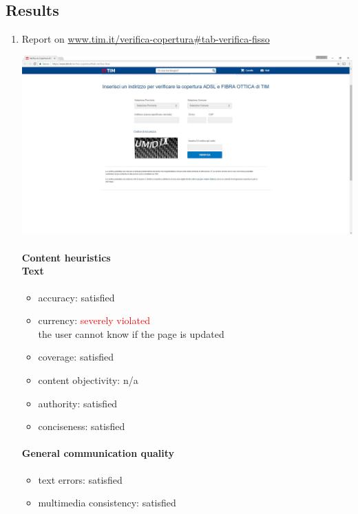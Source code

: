 \subsection{Results}
\begin{enumerate}
	
	
\item Report on \url{www.tim.it/verifica-copertura#tab-verifica-fisso}

\begin{center}
	\includegraphics[width=\textwidth]{Screenshot/copertura.jpg}
\end{center}
\vspace{1cm}

	\paragraph*{Content heuristics \\ Text}
	\begin{itemize}
		\item accuracy: satisfied
		\item currency: \textcolor{red}{severely violated}\\the user cannot know if the page is updated
		\item coverage: satisfied
		\item content objectivity: n/a
		\item authority: satisfied
		\item conciseness: satisfied		
	\end{itemize}
	
	\paragraph*{General communication quality}
	\begin{itemize}
		\item text errors: satisfied
		\item multimedia consistency: satisfied
	\end{itemize}


\end{enumerate}
